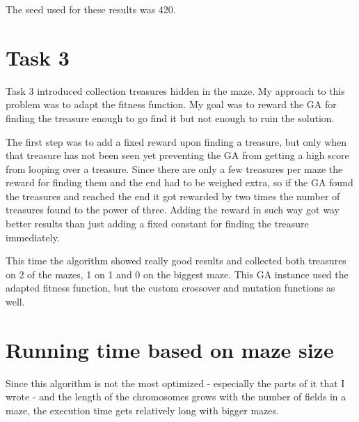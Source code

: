 \documentclass{article}
\begin{document}
\begin{description}
\begin{description}
The seed used for these results was 420.	
		

\end{description}        
\section{Task 3}
Task 3 introduced collection treasures hidden in the maze. My approach to this problem was to adapt the fitness function. My goal was to reward the GA for finding the treasure enough to go find it but not enough to ruin the solution. 

The first step was to add a fixed reward upon finding a treasure, but only when that treasure has not been seen yet preventing the GA from getting a high score from looping over a treasure. Since there are only a few treasures per maze the reward for finding them and the end had to be weighed extra, so if the GA found the treasures and reached the end it got rewarded by two times the number of treasures found to the power of three. Adding the reward in such way got way better results than just adding a fixed constant for finding the treasure immediately. 

This time the algorithm showed really good results and collected both treasures on 2 of the mazes, 1 on 1 and 0 on the biggest maze. This GA instance used the adapted fitness function, but the custom crossover and mutation functions as well. 

\section{Running time based on maze size}
Since this algorithm is not the most optimized - especially the parts of it that I wrote - and the length of the chromosomes grows with the number of fields in a maze, the execution time gets relatively long with bigger mazes.


\end{description}
\end{document}
